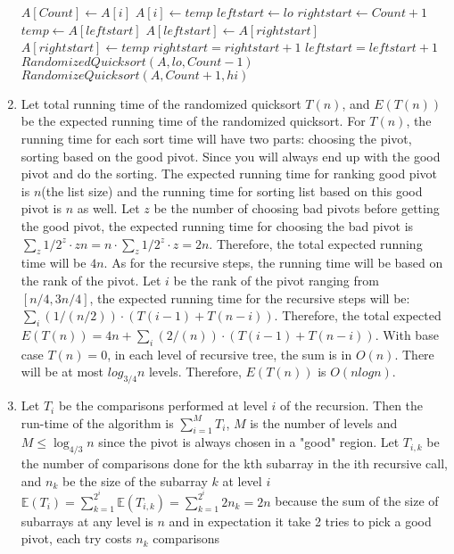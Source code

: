 \documentclass[11pt]{article}
\begin{document}
\begin{solution}
\begin{enumerate}
\begin{algorithm}
\begin{algorithmic}
        \STATE $A[Count] \leftarrow A[i]$
        \STATE $A[i] \leftarrow temp$
        \STATE $leftstart \leftarrow lo$
        \STATE $rightstart \leftarrow Count+1$
        \STATE $temp \leftarrow A[leftstart]$
        \STATE $A[leftstart] \leftarrow A[rightstart]$
        \STATE $A[rightstart] \leftarrow temp$
        \STATE $rightstart = rightstart + 1$
        \ELSE $leftstart = leftstart + 1$ 
        \ENDIF
        \ENDWHILE
        \STATE $RandomizedQuicksort(A,lo,Count-1)$
        \STATE $RandomizeQuicksort(A, Count+1, hi)$
        \end{algorithmic}
        \end{algorithm}
        
    \item   Let total running time of the randomized quicksort $T(n)$, and $E(T(n))$ be the expected running time of the randomized quicksort. For $T(n)$, the running time for each sort time will have two parts: choosing the pivot, sorting based on the good pivot. Since you will always end up with the good pivot and do the sorting. The expected running time for ranking good pivot is $n$(the list size) and the running time for sorting list based on this good pivot is $n$ as well. Let $z$ be the number of choosing bad pivots before getting the good pivot, the expected running time for choosing the bad pivot is $\sum_z 1/2^z \cdot zn = n \cdot \sum_z 1/2^z  \cdot z = 2n$. Therefore, the total expected running time will be $4n$. As for the recursive steps, the running time will be based on the rank of the pivot. Let $i$ be the rank of the pivot ranging from $[n/4,3n/4]$, the expected running time for the recursive steps will be: $\sum_i (1/(n/2))\cdot(T(i-1) + T(n-i))$. Therefore, the total expected $E(T(n)) = 4n + \sum_i (2/(n))\cdot(T(i-1) + T(n-i))$. With base case $T(n) = 0$, in each level of recursive tree, the sum is in $O(n)$. There will be at most $log_{3/4} n$ levels. Therefore, $E(T(n))$ is  $O(nlogn)$.
    \item  
Let $T_i$ be the comparisons performed at level $i$ of the recursion. Then the run-time of the algorithm is $\sum_{i =1}^{M}T_i$, $M$ is the number of levels and $M \leq \log_{4/3}n$ since the pivot is always chosen in a "good" region. Let $T_{i,k}$ be the number of comparisons done for the kth subarray in the ith recursive call, and $n_k$ be the size of the subarray $k$ at level $i$ \\
$\mathbb{E}(T_i) = \sum_{k=1}^{2^i}\mathbb{E}(T_{i,k}) = \sum_{k=1}^{2^i}2n_k = 2n$ because the sum of the size of subarrays at any level is $n$ and in expectation it take 2 tries to pick a good pivot, each try costs $n_k$ comparisons  \\

\end{enumerate}
\end{solution}
\end{document}
